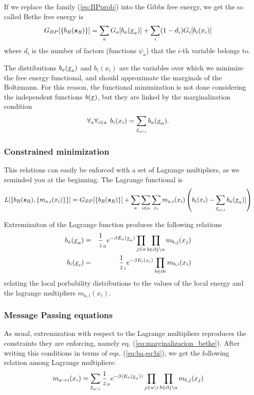 If we replace the family (\ref{eq:BPprob}) into the Gibbs free energy, we get the so called Bethe free energy is
\begin{equation}
 G_{BP}[\{b_R(\bm{s}_R)\}]  = \sum_{a} G_a[b_{a}(\underline{x}_a)] + \sum_i (1-d_i) G_i[b_i(x_i)] \label{eq:free_en_Bethe_D}
\end{equation}
where $d_i$ is the number of factors (functions $\psi_a$) that the $i$-th variable belongs to.

The distributions $b_a(\underline{x}_a)$ and $b_i(x_i)$ are the variables over which we minimize the free energy functional, and should approximate the marginals of the Boltzmann. For this reason, the functional minimization is not done considering the independent functions $b(\underline{x})$, but they are linked by the marginalization condition 
\begin{equation}
\forall_a \forall_{i\in a} \:\: b_i(x_i) = \sum_{\underline{x}_{a \setminus i}} b_a(\underline{x}_a). \label{eq:marginalizacion_bethe}
\end{equation}

\subsubsection*{Constrained minimization}
This relations can easily be enforced with a set of Lagrange multipliers, as we reminded you at the beginning. The Lagrange functional is
\[ L[\{b_R(\bm{s}_R), \{m_{a,i}(x_i)\}\}]  = G_{BP}[\{b_R(\bm{s}_R)\}] +  \sum_{a} \sum_{i \in a} \sum_{x_i} m_{a,i}(x_i) \left( b_i(x_i) - \sum_{\underline{x}_{a \setminus i}} b_a(\underline{x}_a)]  \right)\]

Extremizaiton of the Lagrange function produces the following relations
\begin{eqnarray}
 b_a(\underline{x}_a) &=& \frac 1 z_a e^{-\beta E_a(\underline{x}_a) }\prod_{j\in a} \prod_{b \in \partial j \setminus a} m_{b,j}(x_j) \label{eq:ba} \\
 b_i(\underline{x}_i) &=& \frac 1 z_i e^{-\beta E_i(x_i) } \prod_{b \in \partial i} m_{b,i}(x_i) \label{eq:bi}
\end{eqnarray}
relating the local porbability distributions to the values of the local energy and the lagrange multipliers $m_{a,i}(x_i)$.

\subsubsection*{Message Passing equations}
As usual, extremization with respect to the Lagrange multipliers reproduces the constraints they are enforcing, namely eq. (\ref{eq:marginalizacion_bethe}). After writing this conditions in terms of eqs. (\ref{eq:ba,eq:bi}), we get the following relation among Lagrange multipliers:
\begin{equation}
 m_{a\to i}(x_i) = \sum_{\underline{x}_{a \setminus i}} \frac 1 z_a e^{-\beta (E_a(\underline{x}_a) )}\prod_{j\in a \setminus i} \prod_{b \in \partial j \setminus a} m_{b,j}(x_j)
\end{equation}

